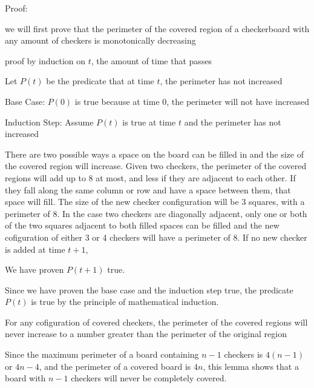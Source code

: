 \documentclass[12pt]{article}[12pt]
\begin{document}
\begin{addmargin}[1em]{2em}

Proof:

we will first prove that the perimeter of the covered region of a checkerboard with any amount of checkers is monotonically decreasing 

proof by induction on $t$, the amount of time that passes

Let $P(t)$ be the predicate that at time $t$, the perimeter has not increased 

Base Case: $P(0)$ is true because at time 0, the perimeter will not have increased 

Induction Step: Assume $P(t)$ is true at time $t$ and the perimeter has not increased

There are two possible ways a space on the board can be filled in and the size of the covered region will increase. Given two checkers, the perimeter of the covered regions will add up to $8$ at most, and less if they are adjacent to each other. If they fall along the same column or row and have a space between them, that space will fill. The size of the new checker configuration will be 3 squares, with a perimeter of $8$. In the case two checkers are diagonally adjacent, only one or both of the two squares adjacent to both filled spaces can be filled and the new cofiguration of either 3 or 4 checkers will have a perimeter of $8$. If no new checker is added at time $t+1$, 

We have proven $P(t+1)$ true.

Since we have proven the base case and the induction step true, the predicate $P(t)$ is true by the principle of mathematical induction.

For any cofiguration of covered checkers, the perimeter of the covered regions will never increase to a number greater than the perimeter of the original region

Since the maximum perimeter of a board containing $n-1$ checkers is $4(n-1)$ or $4n-4$, and the perimeter of a covered board is $4n$, this lemma shows that a board with $n-1$ checkers will never be completely covered.
\end{addmargin}
\end{document}
